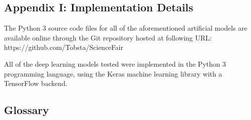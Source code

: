 \documentclass[]{report}
\begin{document}
\subsection{Appendix I: Implementation Details}

The Python 3 source code files for all of the aforementioned artificial models are available online through the Git repository hosted at following URL: https://github.com/Tobsta/ScienceFair

All of the deep learning models tested were implemented in the Python 3 programming language, using the Keras machine learning library with a TensorFlow backend.

\twocolumn
\subsection{Glossary}
\end{document}
